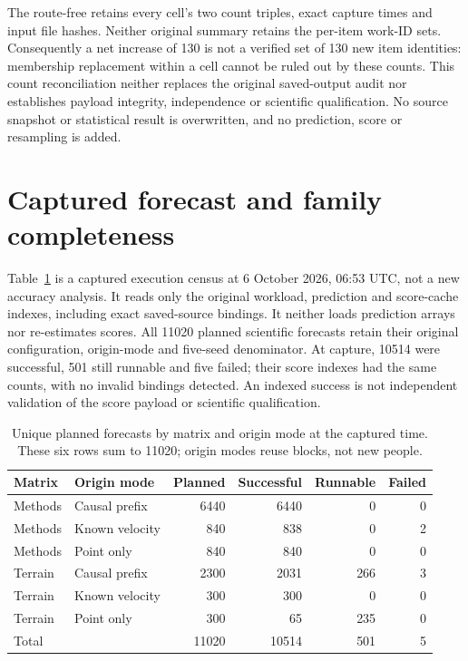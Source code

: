 The route-free 
retains every cell's two count triples, exact capture times and input file
hashes. Neither original summary retains the per-item work-ID sets.
Consequently a net increase of 130 is not a verified set of 130 new item
identities: membership replacement within a cell cannot be ruled out by
these counts. This count reconciliation neither replaces the original
saved-output audit nor establishes payload integrity, independence or
scientific qualification. No source snapshot or statistical result is
overwritten, and no prediction, score or resampling is added.

\clearpage

\section{Captured forecast and family completeness}
\label{sec:execution-coverage}\hypertarget{sec:execution-coverage}{}
Table~\ref{tab:execution-coverage} is a captured execution census at
6 October 2026, 06:53 UTC, not a new accuracy analysis. It reads only the
original workload, prediction and score-cache indexes, including exact
saved-source bindings. It neither loads prediction arrays nor re-estimates
scores. All 11020 planned scientific forecasts retain their original
configuration, origin-mode and five-seed denominator. At capture, 10514 were
successful, 501 still runnable and five failed; their score indexes had
the same counts, with no invalid bindings detected. An indexed success is
not independent validation of the score payload or scientific qualification.

\begin{table}[htbp]
\centering\small
\caption{Unique planned forecasts by matrix and origin mode at the captured
time. These six rows sum to 11020; origin modes reuse blocks, not new people.}
\label{tab:execution-coverage}\hypertarget{tab:execution-coverage}{}
\begin{tabular}{@{}llrrrr@{}}
\toprule
Matrix & Origin mode & Planned & Successful & Runnable & Failed\\
\midrule
Methods & Causal prefix & 6440 & 6440 & 0 & 0\\
Methods & Known velocity & 840 & 838 & 0 & 2\\
Methods & Point only & 840 & 840 & 0 & 0\\
Terrain & Causal prefix & 2300 & 2031 & 266 & 3\\
Terrain & Known velocity & 300 & 300 & 0 & 0\\
Terrain & Point only & 300 & 65 & 235 & 0\\
\midrule
Total & & 11020 & 10514 & 501 & 5\\
\bottomrule
\end{tabular}
\end{table}

